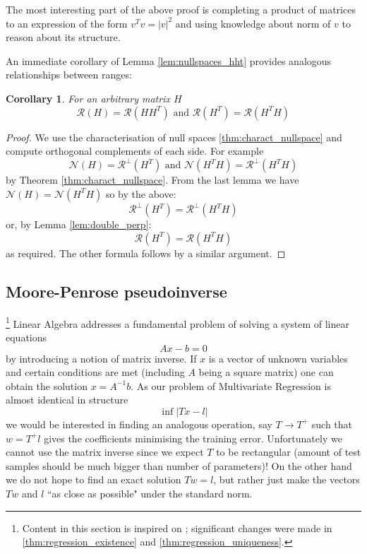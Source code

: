\documentclass[a4paper,11pt]{article}
\theoremstyle{break}
\newtheorem{corollary}{Corollary}[theorem]
\newcommand{\Nu}{\mathcal{N}}
\newcommand{\Ra}{\mathcal{R}}
\begin{document}
The most interesting part of the above proof is completing a product of matrices to an expression of the form $v^T v = | v |^2 $ and using knowledge about norm of $v$ to reason about its structure.

An immediate corollary of Lemma \ref{lem:nullspaces_hht} provides analogous relationships between ranges:

\begin{corollary}\label{cor:equal_ranges}
    For an arbitrary matrix $H$
    $$\Ra(H) = \Ra(H H^T) \text{ and } \Ra(H^T) = \Ra(H^T H)$$
\end{corollary}

\begin{proof}
    We use the characterisation of null spaces \ref{thm:charact_nullspace} and compute orthogonal complements of each side. For example
    $$ \Nu(H) = \Ra^\perp (H^T) \text{ and } \Nu(H^T H) = \Ra^\perp ( H^T H )$$
    by Theorem \ref{thm:charact_nullspace}. From the last lemma we have
    $ \Nu(H) = \Nu(H^T H) $ so by the above:
    $$ \Ra^\perp (H^T) = \Ra^\perp ( H^T H ) $$
    or, by Lemma \ref{lem:double_perp}:
    $$ \Ra (H^T) = \Ra( H^T H ) $$
    as required. The other formula follows by a similar argument.
\end{proof}


\subsection{Moore-Penrose pseudoinverse}
\footnote{Content in this section is inspired on \cite[pp15-24]{albert}; significant changes were made in \ref{thm:regression_existence} and \ref{thm:regression_uniqueness}.}
Linear Algebra addresses a fundamental problem of solving a system of linear equations
$$ A x - b = 0$$
by introducing a notion of matrix inverse. If $x$ is a vector of unknown variables and certain conditions are met (including $A$ being a square matrix) one can obtain the solution $ x = A^{-1} b $.
As our problem of Multivariate Regression is almost identical in structure
$$ \inf | T x - l | $$
we would be interested in finding an analogous operation, say $ T \to T^+$ such that $ w = T^+ l$ gives the coefficients minimising the training error. 
Unfortunately we cannot use the matrix inverse since we expect $T$ to be rectangular (amount of test samples should be much bigger than number of parameters)!
On the other hand we do not hope to find an exact solution $ T w = l$, but rather just make the vectors $T w$ and $l$ ``as close as possible" under the standard norm.
\end{document}
